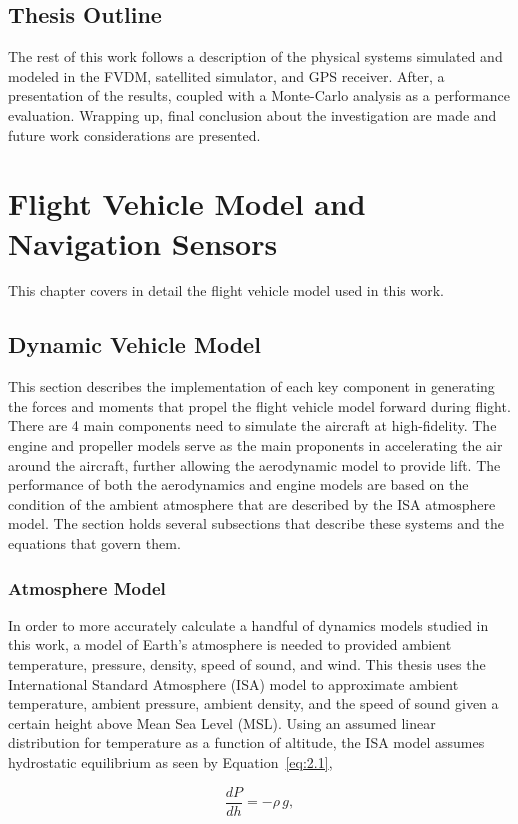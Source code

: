 \documentclass[12pt]{report}
\begin{document}
\section{Thesis Outline}
The rest of this work follows a description of the physical systems simulated and modeled in the FVDM, satellited simulator, and GPS receiver. After, a presentation of the results, coupled with a Monte-Carlo analysis as a performance evaluation. Wrapping up, final conclusion about the investigation are made and future work considerations are presented.


\chapter{Flight Vehicle Model and Navigation Sensors}
This chapter covers in detail the flight vehicle model used in this work.

\section{Dynamic Vehicle Model}
This section describes the implementation of each key component in generating the forces and moments that propel the flight vehicle model forward during flight. There are 4 main components need to simulate the aircraft at high-fidelity. The engine and propeller models serve as the main proponents in accelerating the air around the aircraft, further allowing the aerodynamic model to provide lift. The performance of both the aerodynamics and engine models are based on the condition of the ambient atmosphere that are described by the ISA atmosphere model. The section holds several subsections that describe these systems and the equations that govern them.
\clearpage
\subsection{Atmosphere Model}
In order to more accurately calculate a handful of dynamics models studied in this work, a model of Earth's atmosphere is needed to provided ambient temperature, pressure, density, speed of sound, and wind. This thesis uses the International Standard Atmosphere (ISA) model to approximate ambient temperature, ambient pressure, ambient density, and the speed of sound given a certain height above Mean Sea Level (MSL). Using an assumed linear distribution for temperature as a function of altitude, the ISA model assumes hydrostatic equilibrium as seen by Equation~\ref{eq:2.1},

\begin{equation}
  \frac{dP}{dh} = -\rho \, g,
  \label{eq:2.1}
\end{equation}
\end{document}
